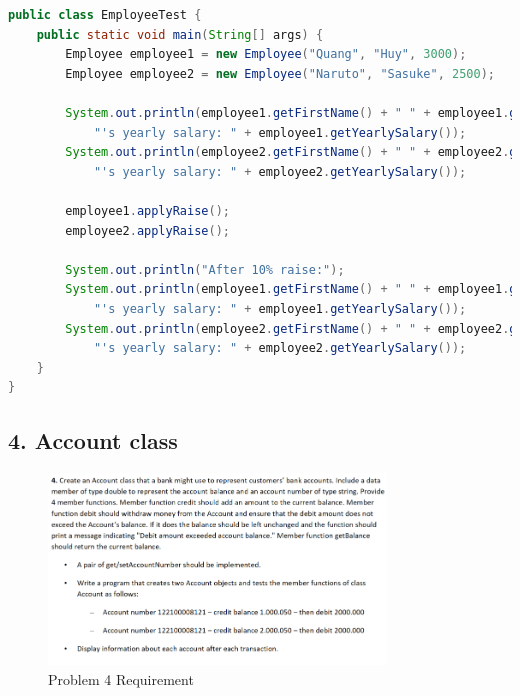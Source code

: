 \documentclass{article}
\begin{document}
\begin{lstlisting}[language=Java, caption=EmployeeTest.java]
public class EmployeeTest {
    public static void main(String[] args) {
        Employee employee1 = new Employee("Quang", "Huy", 3000);
        Employee employee2 = new Employee("Naruto", "Sasuke", 2500);

        System.out.println(employee1.getFirstName() + " " + employee1.getLastName() +
            "'s yearly salary: " + employee1.getYearlySalary());
        System.out.println(employee2.getFirstName() + " " + employee2.getLastName() +
            "'s yearly salary: " + employee2.getYearlySalary());

        employee1.applyRaise();
        employee2.applyRaise();

        System.out.println("After 10% raise:");
        System.out.println(employee1.getFirstName() + " " + employee1.getLastName() +
            "'s yearly salary: " + employee1.getYearlySalary());
        System.out.println(employee2.getFirstName() + " " + employee2.getLastName() +
            "'s yearly salary: " + employee2.getYearlySalary());
    }
}
\end{lstlisting}

\subsection*{4. Account class}

\begin{figure}[H]
    \centering
    \includegraphics[width=0.8\textwidth]{./Assets/Task requirements/Assignment8/4.png}
    \caption{Problem 4 Requirement}
\end{figure}
\end{document}

